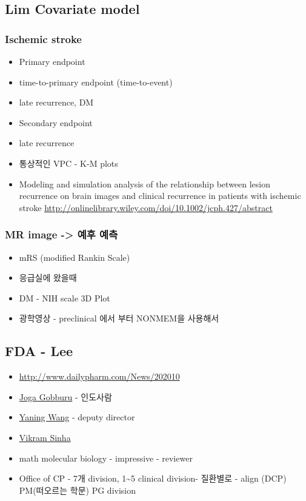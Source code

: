 \documentclass[]{book}
\providecommand{\tightlist}{%
  \setlength{\itemsep}{0pt}\setlength{\parskip}{0pt}}
\begin{document}
\subsection{Lim Covariate model}\label{lim-covariate-model}

\subsubsection{Ischemic stroke}\label{ischemic-stroke}

\begin{itemize}
\tightlist
\item
  Primary endpoint
\item
  time-to-primary endpoint (time-to-event)
\item
  late recurrence, DM
\item
  Secondary endpoint
\item
  late recurrence
\item
  통상적인 VPC - K-M plots
\item
  Modeling and simulation analysis of the relationship between lesion
  recurrence on brain images and clinical recurrence in patients with
  ischemic stroke
  \url{http://onlinelibrary.wiley.com/doi/10.1002/jcph.427/abstract}
  \citep{Lim_2014}
\end{itemize}

\subsubsection{MR image -\textgreater{} 예후 예측}\label{mr-image----}

\begin{itemize}
\tightlist
\item
  mRS (modified Rankin Scale)
\item
  응급실에 왔을때
\item
  DM - NIH scale 3D Plot
\item
  광학영상 - preclinical 에서 부터 NONMEM을 사용해서
\end{itemize}

\subsection{FDA - Lee}\label{fda---lee}

\begin{itemize}
\tightlist
\item
  \url{http://www.dailypharm.com/News/202010}
\item
  \href{https://www.linkedin.com/in/jogagobburu}{Joga Gobburu} -
  인도사람
\item
  \href{https://www.linkedin.com/in/yaning-wang-a47192b}{Yaning Wang} -
  deputy director
\item
  \href{https://www.linkedin.com/in/vikram-sinha-9a28476}{Vikram Sinha}
\item
  math molecular biology - impressive - reviewer
\item
  Office of CP - 7개 division, 1\textasciitilde{}5 clinical division-
  질환별로 - align (DCP) PM(떠오르는 학문) PG division
\end{itemize}
\end{document}
